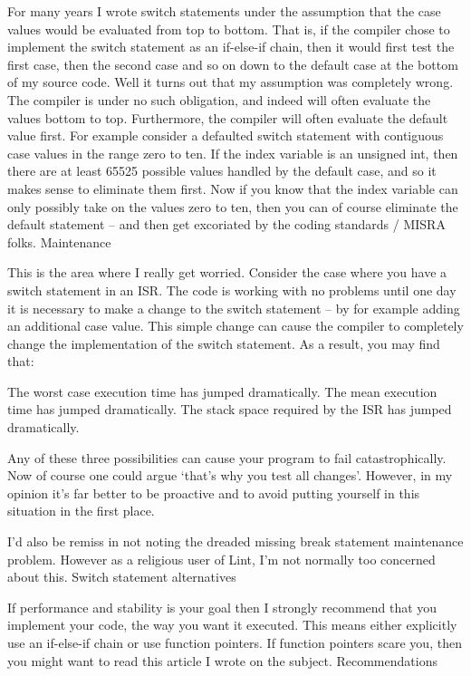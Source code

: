 {{{{{{{{{{For many years I wrote switch statements under the assumption that the case values would be evaluated from top to bottom. That is, if the compiler chose to implement the switch statement as an if-else-if chain, then it would first test the first case, then the second case and so on down to the default case at the bottom of my source code. Well it turns out that my assumption was completely wrong. The compiler is under no such obligation, and indeed will often evaluate the values bottom to top. Furthermore, the compiler will often evaluate the default value first. For example consider a defaulted switch statement with contiguous case values in the range zero to ten. If the index variable is an unsigned int, then there are at least 65525 possible values handled by the default case, and so it makes sense to eliminate them first. Now if you know that the index variable can only possibly take on the values zero to ten, then you can of course eliminate the default statement – and then get excoriated by the coding standards / MISRA folks.
Maintenance

This is the area where I really get worried. Consider the case where you have a switch statement in an ISR. The code is working with no problems until one day it is necessary to make a change to the switch statement – by for example adding an additional case value. This simple change can cause the compiler to completely change the implementation of the switch statement. As a result, you may find that:

    The worst case execution time has jumped dramatically.
    The mean execution time has jumped dramatically.
    The stack space required by the ISR has jumped dramatically.

Any of these three possibilities can cause your program to fail catastrophically. Now of course one could argue ‘that’s why you test all changes’. However, in my opinion it’s far better to be proactive and to avoid putting yourself in this situation in the first place.

I’d also be remiss in not noting the dreaded missing break statement maintenance problem. However as a religious user of Lint, I’m not normally too concerned about this.
Switch statement alternatives

If performance and stability is your goal then I strongly recommend that you implement your code, the way you want it executed. This means either explicitly use an if-else-if chain or use function pointers. If function pointers scare you, then you might want to read this article I wrote on the subject.
Recommendations

}}}}}}}}}}
